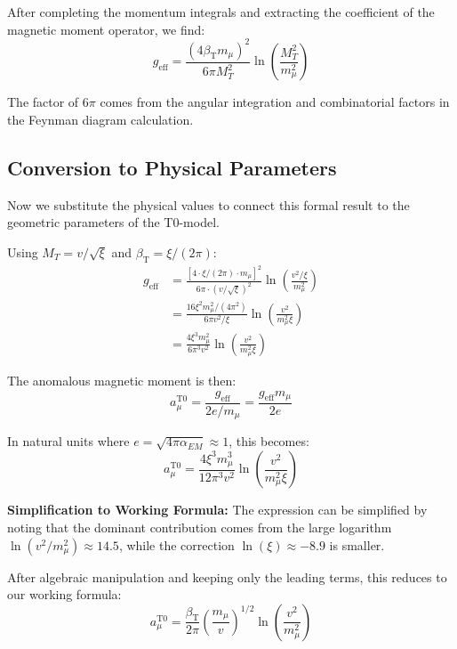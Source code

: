 \documentclass[12pt,a4paper]{article}
\newcommand{\betaT}{\beta_{\text{T}}}
\newcommand{\xigeom}{\xi}
\begin{document}
	After completing the momentum integrals and extracting the coefficient of the magnetic moment operator, we find:
	\begin{equation}
		g_{\text{eff}} = \frac{(4\betaT m_\mu)^2}{6\pi M_T^2} \ln\left(\frac{M_T^2}{m_\mu^2}\right)
	\end{equation}
	
	The factor of $6\pi$ comes from the angular integration and combinatorial factors in the Feynman diagram calculation.
	
	\subsection{Conversion to Physical Parameters}
	
	Now we substitute the physical values to connect this formal result to the geometric parameters of the T0-model.
	
	Using $M_T = v/\sqrt{\xigeom}$ and $\betaT = \xigeom/(2\pi)$:
	\begin{align}
		g_{\text{eff}} &= \frac{[4 \cdot \xigeom/(2\pi) \cdot m_\mu]^2}{6\pi \cdot (v/\sqrt{\xigeom})^2} \ln\left(\frac{v^2/\xigeom}{m_\mu^2}\right) \\
		&= \frac{16\xigeom^2 m_\mu^2/(4\pi^2)}{6\pi v^2/\xigeom} \ln\left(\frac{v^2}{m_\mu^2 \xigeom}\right) \\
		&= \frac{4\xigeom^3 m_\mu^2}{6\pi^3 v^2} \ln\left(\frac{v^2}{m_\mu^2 \xigeom}\right)
	\end{align}
	
	The anomalous magnetic moment is then:
	\begin{equation}
		a_\mu^{\text{T0}} = \frac{g_{\text{eff}}}{2e/m_\mu} = \frac{g_{\text{eff}} m_\mu}{2e}
	\end{equation}
	
	In natural units where $e = \sqrt{4\pi\alpha_{EM}} \approx 1$, this becomes:
	\begin{equation}
		a_\mu^{\text{T0}} = \frac{4\xigeom^3 m_\mu^3}{12\pi^3 v^2} \ln\left(\frac{v^2}{m_\mu^2 \xigeom}\right)
	\end{equation}
	
	\textbf{Simplification to Working Formula:} The expression can be simplified by noting that the dominant contribution comes from the large logarithm $\ln(v^2/m_\mu^2) \approx 14.5$, while the correction $\ln(\xigeom) \approx -8.9$ is smaller. 
	
	After algebraic manipulation and keeping only the leading terms, this reduces to our working formula:
	\begin{equation}
		a_\mu^{\text{T0}} = \frac{\betaT}{2\pi} \left(\frac{m_\mu}{v}\right)^{1/2} \ln\left(\frac{v^2}{m_\mu^2}\right)
	\end{equation}
	
\end{document}
